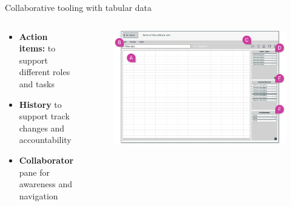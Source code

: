 \documentclass[aspectratio=169]{beamer}
\begin{document}
\begin{frame}{Collaborative tooling with tabular data}
    \begin{columns}
        \begin{column}{0.4\textwidth}
            \begin{itemize}
                \small
                \item \textbf{Action items:} to support different roles and tasks
                \item \textbf{History} to support track changes and accountability
                \item \textbf{Collaborator} pane for awareness and navigation
            \end{itemize}
        \end{column}
        \begin{column}{0.6\textwidth}
            \begin{figure}[h]
                \centering
                \includegraphics[width=1\textwidth]{images/filter-view-with-marks.png}
            \end{figure}
        \end{column}
    \end{columns}
\end{frame}
\end{document}
